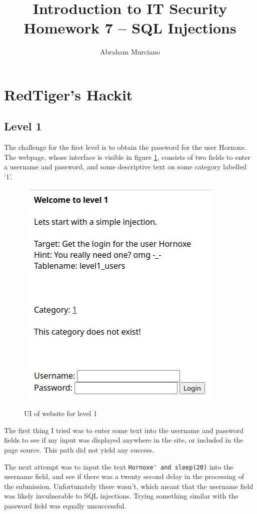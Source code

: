 \documentclass{article}
\title{Introduction to IT Security\\
\medskip
\large Homework 7 -- SQL Injections}
\author{Abraham Murciano}
\begin{document}
\maketitle

\section{RedTiger's Hackit}

\subsection{Level 1}

The challenge for the first level is to obtain the password for the user Hornoxe. The webpage, whose interface is visible in figure \ref{1.1.ui}, consists of two fields to enter a username and password, and some descriptive text on some category labelled `1'.

\begin{figure}[htbp]\
	\centering
	\includegraphics[scale=0.6]{1.1.ui.jpg}
	\caption{UI of website for level 1}
	\label{1.1.ui}
\end{figure}

The first thing I tried was to enter some text into the username and password fields to see if my input was displayed anywhere in the site, or included in the page source. This path did not yield any success.

The next attempt was to input the text \verb`Hornoxe' and sleep(20)` into the username field, and see if there was a twenty second delay in the processing of the submission. Unfortunately there wasn't, which meant that the username field was likely invulnerable to SQL injections. Trying something similar with the password field was equally unsuccessful.
\end{document}
